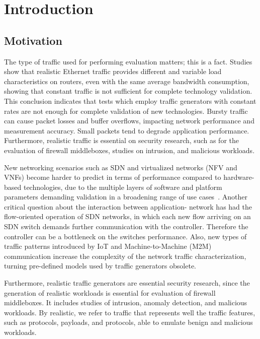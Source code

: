 \chapter{Introduction}\label{ch:introduction}

\section{Motivation}
 

The type of traffic used for performing evaluation matters; this is a fact. Studies show that realistic Ethernet traffic provides different and variable load characteristics on routers\cite{harpoon-validation}, even with the same average bandwidth consumption, showing that constant traffic is not sufficient for complete technology validation. This conclusion indicates that tests which employ traffic generators with constant rates are not enough for complete validation of new technologies. Bursty traffic can cause packet losses and buffer overflows, impacting network performance and measurement accuracy\cite{burstiness-queue-lenght}. Small packets tend to degrade application performance\cite{comparative-trafficgen-tools}.  Furthermore, realistic traffic is essential on security research, such as for the evaluation of firewall middleboxes, studies on intrusion, and malicious workloads\cite{ditg-paper}. 

New networking scenarios such as \acrfull{SDN} and virtualized networks (\acrfull{NFV} and \acrfull{VNF}s) become harder to predict in terms of performance compared to hardware-based technologies, due to the multiple layers of software and platform parameters demanding validation in a broadening range of use cases~\cite{nfv-challenges}. Another critical question about the interaction between application- network has had the flow-oriented operation of SDN networks, in which each new flow arriving on an SDN switch demands further communication with the controller. Therefore the controller can be a bottleneck on the switches performance.  Also,  new types of traffic patterns introduced by \acrfull{IoT} and Machine-to-Machine (\acrfull{M2M}) communication\cite{machine2machine}  increase the complexity of the network traffic characterization, turning pre-defined models used by traffic generators obsolete. 

Furthermore, realistic traffic generators are essential security research, since the generation of realistic workloads is essential for evaluation of firewall middleboxes. It includes studies of intrusion, anomaly detection, and malicious workloads. By realistic, we refer to traffic that represents well the traffic features, such as protocols, payloads, and protocols, able to emulate benign and malicious workloads. 


